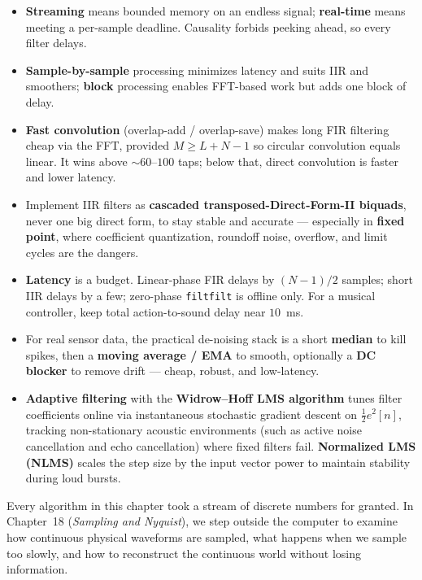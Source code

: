 \begin{itemize}
  \item \textbf{Streaming} means bounded memory on an endless signal;
        \textbf{real-time} means meeting a per-sample deadline. Causality forbids
        peeking ahead, so every filter delays.
  \item \textbf{Sample-by-sample} processing minimizes latency and suits IIR and
        smoothers; \textbf{block} processing enables FFT-based work but adds one
        block of delay.
  \item \textbf{Fast convolution} (overlap-add / overlap-save) makes long FIR
        filtering cheap via the FFT, provided $M \ge L+N-1$ so circular
        convolution equals linear. It wins above $\sim 60$--$100$ taps; below
        that, direct convolution is faster and lower latency.
  \item Implement IIR filters as \textbf{cascaded transposed-Direct-Form-II
        biquads}, never one big direct form, to stay stable and accurate ---
        especially in \textbf{fixed point}, where coefficient quantization,
        roundoff noise, overflow, and limit cycles are the dangers.
  \item \textbf{Latency} is a budget. Linear-phase FIR delays by $(N-1)/2$
        samples; short IIR delays by a few; zero-phase \texttt{filtfilt} is
        offline only. For a musical controller, keep total action-to-sound delay
        near $10$~ms.
  \item For real sensor data, the practical de-noising stack is a short
        \textbf{median} to kill spikes, then a \textbf{moving average / EMA} to
        smooth, optionally a \textbf{DC blocker} to remove drift --- cheap,
        robust, and low-latency.
  \item \textbf{Adaptive filtering} with the \textbf{Widrow--Hoff LMS algorithm}
        tunes filter coefficients online via instantaneous stochastic gradient
        descent on $\frac{1}{2}e^2[n]$, tracking non-stationary acoustic environments
        (such as active noise cancellation and echo cancellation) where fixed filters
        fail. \textbf{Normalized LMS (NLMS)} scales the step size by the input
        vector power to maintain stability during loud bursts.
\end{itemize}

Every algorithm in this chapter took a stream of discrete numbers for granted.
In Chapter~18 (\emph{Sampling and Nyquist}), we step outside the computer to examine how
continuous physical waveforms are sampled, what happens when we sample too slowly, and how to
reconstruct the continuous world without losing information.

